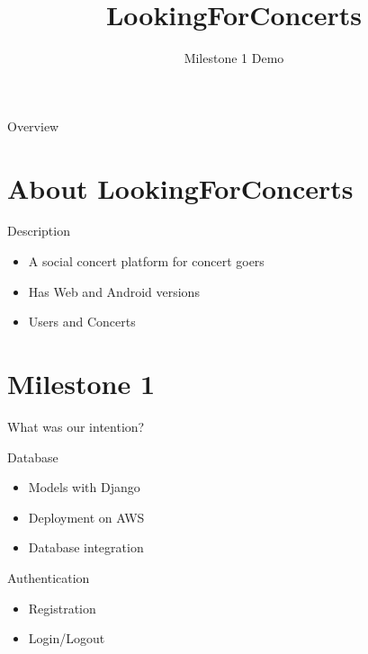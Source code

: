 \documentclass{beamer}
\title
  [LookingForConcerts]
  {LookingForConcerts}
\author
  []
  {Milestone 1 Demo}
\date
  {}
\institute
  {}
\begin{document}
\maketitle

\begin{frame}{Overview}

  \tableofcontents

\end{frame}

\section
  {About LookingForConcerts}

\begin{frame}{Description}
	\begin{block}{}
		\begin{itemize}
		\item A social concert platform for concert goers
		\item Has Web and Android versions
		\item Users and Concerts
		\end{itemize}
	\end{block}		
	
\end{frame}

\section
  {Milestone 1}

\begin{frame}{What was our intention?}
  \begin{block}{Database}
    \begin{itemize}
  	\item Models with Django
  	\item Deployment on AWS
  	\item Database integration
    \end{itemize}
  \end{block}
  
  \begin{block}{Authentication}
    \begin{itemize}
    \item Registration
    \item Login/Logout
    \end{itemize}
  \end{block}
\end{frame}
\end{document}

